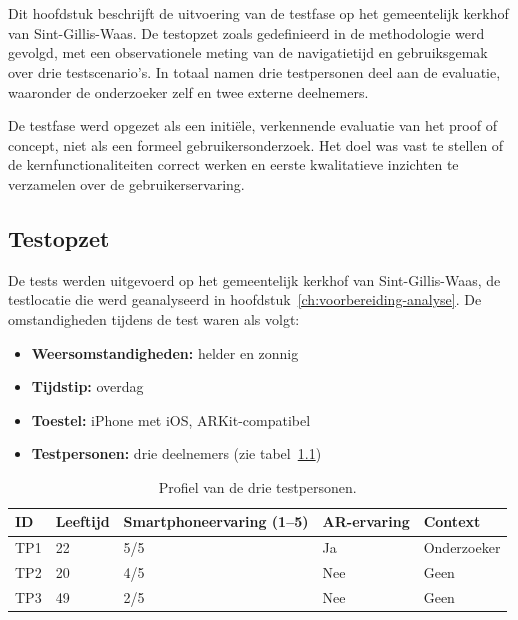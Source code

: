 \chapter{}%
\label{ch:testen}

Dit hoofdstuk beschrijft de uitvoering van de testfase op het gemeentelijk
kerkhof van Sint-Gillis-Waas. De testopzet zoals gedefinieerd in de methodologie
werd gevolgd, met een observationele meting van de navigatietijd en gebruiksgemak
over drie testscenario's. In totaal namen drie testpersonen deel aan de evaluatie,
waaronder de onderzoeker zelf en twee externe deelnemers.

De testfase werd opgezet als een initiële, verkennende evaluatie van het
proof of concept, niet als een formeel gebruikersonderzoek. Het doel was
vast te stellen of de kernfunctionaliteiten correct werken en eerste
kwalitatieve inzichten te verzamelen over de gebruikerservaring.

\section{Testopzet}

De tests werden uitgevoerd op het gemeentelijk kerkhof van Sint-Gillis-Waas,
de testlocatie die werd geanalyseerd in hoofdstuk~\ref{ch:voorbereiding-analyse}.
De omstandigheden tijdens de test waren als volgt:

\begin{itemize}
    \item \textbf{Weersomstandigheden:} helder en zonnig
    \item \textbf{Tijdstip:} overdag
    \item \textbf{Toestel:} iPhone met iOS, ARKit-compatibel
    \item \textbf{Testpersonen:} drie deelnemers (zie tabel~\ref{tab:testpersonen})
\end{itemize}

\begin{table}[h]
    \centering
    \caption[Overzicht testpersonen]{Profiel van de drie testpersonen.}
    \label{tab:testpersonen}
    \renewcommand{\arraystretch}{1.4}
    \begin{tabular}{p{1.5cm} p{2cm} p{4cm} p{2.5cm} p{2cm}}
        \hline
        \textbf{ID} & \textbf{Leeftijd} & \textbf{Smartphoneervaring (1--5)} & \textbf{AR-ervaring} & \textbf{Context} \\
        \hline
        TP1 & 22 & 5/5 & Ja & Onderzoeker \\
        \hline
        TP2 & 20 & 4/5 & Nee & Geen \\
        \hline
        TP3 & 49 & 2/5 & Nee & Geen \\
        \hline
    \end{tabular}
\end{table}

